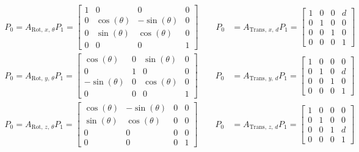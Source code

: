 \documentclass{article}
\begin{document}
    \begin{align*}
        P_{0} = A_{\text{Rot, }x\text{, } \theta} P_{1} =
        \begin{bmatrix}
            1 & 0            &  0            & 0 \\
            0 & \cos(\theta) & -\sin(\theta) & 0 \\
            0 & \sin(\theta) &  \cos(\theta) & 0 \\
            0 & 0            &  0            & 1
        \end{bmatrix} \qquad
        P_{0} &= A_{\text{Trans, }x\text{, } d} P_{1} =
        \begin{bmatrix}
            1 & 0 & 0 & d \\
            0 & 1 & 0 & 0 \\
            0 & 0 & 1 & 0 \\
            0 & 0 & 0 & 1
        \end{bmatrix} \\
        P_{0} = A_{\text{Rot, }y\text{, } \theta} P_{1} =
        \begin{bmatrix}
             \cos(\theta) & 0 & \sin(\theta) & 0 \\
             0            & 1 & 0            & 0 \\
            -\sin(\theta) & 0 & \cos(\theta) & 0 \\
             0            & 0 & 0            & 1
        \end{bmatrix} \qquad
        P_{0} &= A_{\text{Trans, }y\text{, } d} P_{1} =
        \begin{bmatrix}
            1 & 0 & 0 & 0 \\
            0 & 1 & 0 & d \\
            0 & 0 & 1 & 0 \\
            0 & 0 & 0 & 1
        \end{bmatrix} \\
        P_{0} = A_{\text{Rot, }z\text{, } \theta} P_{1} =
        \begin{bmatrix}
            \cos(\theta) & -\sin(\theta) & 0 & 0 \\
            \sin(\theta) &  \cos(\theta) & 0 & 0 \\
            0            & 0             & 0 & 0 \\
            0            & 0             & 0 & 1
        \end{bmatrix} \qquad
        P_{0} &= A_{\text{Trans, }z\text{, } d} P_{1} =
        \begin{bmatrix}
            1 & 0 & 0 & 0 \\
            0 & 1 & 0 & 0 \\
            0 & 0 & 1 & d \\
            0 & 0 & 0 & 1
        \end{bmatrix}
    \end{align*}
    
\end{document}
